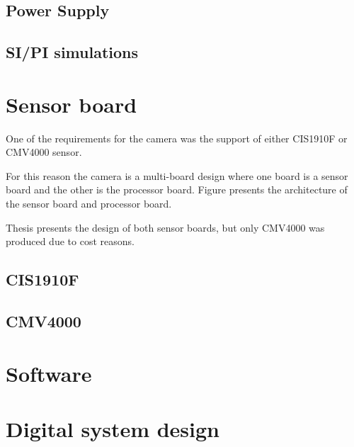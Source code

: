 \subsection{Power Supply}

\subsection{SI/PI simulations}

\section{Sensor board}
One of the requirements for the camera was the support of either CIS1910F or CMV4000 sensor. 

For this reason the camera is a multi-board design where one board is a sensor board and the other is the processor board. Figure presents the architecture of the sensor board and processor board. 

Thesis presents the design of both sensor boards, but only CMV4000 was produced due to cost reasons.

\subsection{CIS1910F}
\subsection{CMV4000}

\section{Software}

\section{Digital system design}


